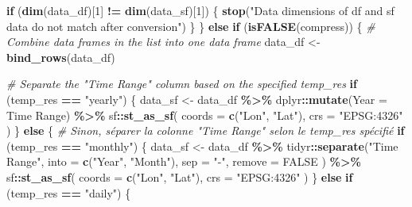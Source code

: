\documentclass[
]{article}
\newenvironment{Shaded}{\begin{snugshade}}{\end{snugshade}}
\newcommand{\AttributeTok}[1]{\textcolor[rgb]{0.13,0.29,0.53}{#1}}
\newcommand{\CommentTok}[1]{\textcolor[rgb]{0.56,0.35,0.01}{\textit{#1}}}
\newcommand{\ConstantTok}[1]{\textcolor[rgb]{0.56,0.35,0.01}{#1}}
\newcommand{\ControlFlowTok}[1]{\textcolor[rgb]{0.13,0.29,0.53}{\textbf{#1}}}
\newcommand{\DecValTok}[1]{\textcolor[rgb]{0.00,0.00,0.81}{#1}}
\newcommand{\FunctionTok}[1]{\textcolor[rgb]{0.13,0.29,0.53}{\textbf{#1}}}
\newcommand{\NormalTok}[1]{#1}
\newcommand{\OtherTok}[1]{\textcolor[rgb]{0.56,0.35,0.01}{#1}}
\newcommand{\SpecialCharTok}[1]{\textcolor[rgb]{0.81,0.36,0.00}{\textbf{#1}}}
\newcommand{\StringTok}[1]{\textcolor[rgb]{0.31,0.60,0.02}{#1}}
\begin{document}
\begin{Shaded}
\begin{Highlighting}[]
    \ControlFlowTok{if}\NormalTok{ (}\FunctionTok{dim}\NormalTok{(data\_df)[}\DecValTok{1}\NormalTok{] }\SpecialCharTok{!=} \FunctionTok{dim}\NormalTok{(data\_sf)[}\DecValTok{1}\NormalTok{]) \{}
      \FunctionTok{stop}\NormalTok{(}\StringTok{"Data dimensions of df and sf data do not match after conversion"}\NormalTok{)}
\NormalTok{    \}}
\NormalTok{  \} }\ControlFlowTok{else} \ControlFlowTok{if}\NormalTok{ (}\FunctionTok{isFALSE}\NormalTok{(compress)) \{}
    \CommentTok{\# Combine data frames in the list into one data frame}
\NormalTok{    data\_df }\OtherTok{\textless{}{-}} \FunctionTok{bind\_rows}\NormalTok{(data\_df)}

    \CommentTok{\# Separate the "Time Range" column based on the specified temp\_res}
    \ControlFlowTok{if}\NormalTok{ (temp\_res }\SpecialCharTok{==} \StringTok{"yearly"}\NormalTok{) \{}
\NormalTok{      data\_sf }\OtherTok{\textless{}{-}}\NormalTok{ data\_df }\SpecialCharTok{\%\textgreater{}\%}
\NormalTok{        dplyr}\SpecialCharTok{::}\FunctionTok{mutate}\NormalTok{(}\AttributeTok{Year =} \StringTok{\textasciigrave{}}\AttributeTok{Time Range}\StringTok{\textasciigrave{}}\NormalTok{) }\SpecialCharTok{\%\textgreater{}\%}
\NormalTok{        sf}\SpecialCharTok{::}\FunctionTok{st\_as\_sf}\NormalTok{(}
          \AttributeTok{coords =} \FunctionTok{c}\NormalTok{(}\StringTok{"Lon"}\NormalTok{, }\StringTok{"Lat"}\NormalTok{),}
          \AttributeTok{crs =} \StringTok{"EPSG:4326"}
\NormalTok{        )}
\NormalTok{    \} }\ControlFlowTok{else}\NormalTok{ \{}
      \CommentTok{\# Sinon, séparer la colonne "Time Range" selon le temp\_res spécifié}
      \ControlFlowTok{if}\NormalTok{ (temp\_res }\SpecialCharTok{==} \StringTok{"monthly"}\NormalTok{) \{}
\NormalTok{        data\_sf }\OtherTok{\textless{}{-}}\NormalTok{ data\_df }\SpecialCharTok{\%\textgreater{}\%}
\NormalTok{          tidyr}\SpecialCharTok{::}\FunctionTok{separate}\NormalTok{(}\StringTok{"Time Range"}\NormalTok{,}
            \AttributeTok{into =} \FunctionTok{c}\NormalTok{(}\StringTok{"Year"}\NormalTok{, }\StringTok{"Month"}\NormalTok{),}
            \AttributeTok{sep =} \StringTok{"{-}"}\NormalTok{,}
            \AttributeTok{remove =} \ConstantTok{FALSE}
\NormalTok{          ) }\SpecialCharTok{\%\textgreater{}\%}
\NormalTok{          sf}\SpecialCharTok{::}\FunctionTok{st\_as\_sf}\NormalTok{(}
            \AttributeTok{coords =} \FunctionTok{c}\NormalTok{(}\StringTok{"Lon"}\NormalTok{, }\StringTok{"Lat"}\NormalTok{),}
            \AttributeTok{crs =} \StringTok{"EPSG:4326"}
\NormalTok{          )}
\NormalTok{      \} }\ControlFlowTok{else} \ControlFlowTok{if}\NormalTok{ (temp\_res }\SpecialCharTok{==} \StringTok{"daily"}\NormalTok{) \{}

\end{Highlighting}
\end{Shaded}
\end{document}
